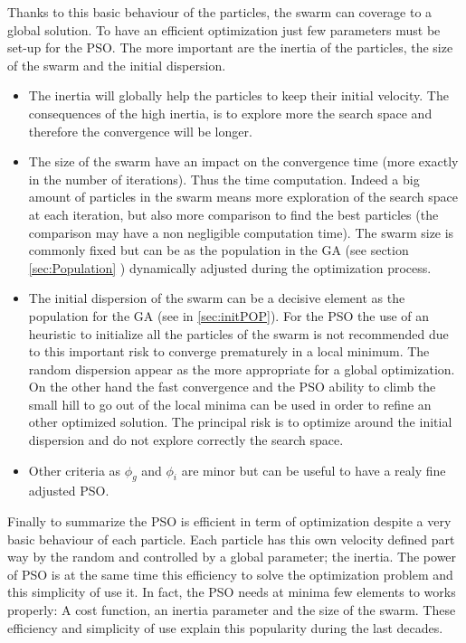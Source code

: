 Thanks to this basic behaviour of the particles, the swarm can coverage to a global solution. 
To have an efficient optimization just few parameters must be set-up for the PSO.  
The more important are the inertia of the particles, the size of the swarm and the initial dispersion.
\begin{itemize}
\item The inertia will globally help the particles to keep their initial velocity. The consequences of the high inertia, is to explore more the search space and therefore the convergence will be longer. 
\item The size of the swarm  have an impact on the convergence time (more exactly in the  number of iterations). Thus the time computation. Indeed a big amount of particles in the swarm  means more exploration of the search space at each iteration, but also more comparison to find the best particles (the comparison may have a non negligible computation time). 
The swarm size is commonly fixed but can be as the population in the GA (see section \ref{sec:Population} ) dynamically adjusted during the optimization process. 

\item The initial dispersion of the swarm can be a decisive element as the population for the GA (see in \ref{sec:initPOP}). For the PSO the use of an heuristic to initialize all the particles of the swarm is not recommended due to this important risk to converge prematurely in a local minimum. The random dispersion appear as the more appropriate for a global optimization. On the other hand the fast convergence and the PSO ability to climb the small hill to go out of the local minima can be used in order to refine an other optimized solution. The principal risk is to optimize around the initial dispersion and do not explore correctly the search space.  
\item Other criteria as $\phi_g$ and $\phi_i$ are minor but can be useful to have a realy fine adjusted PSO.
\end{itemize}

Finally to summarize the PSO is efficient in term of optimization despite a very basic behaviour of each  particle. Each particle has this own velocity defined part way by the random and controlled by a global parameter; the inertia.
 The power of PSO is at the same time this efficiency to solve the optimization problem and this simplicity of use it. In fact, the PSO needs at minima few elements to works properly:
 A cost function, an inertia parameter and the size of the swarm. These efficiency and simplicity of use explain this popularity during the last decades.
 





